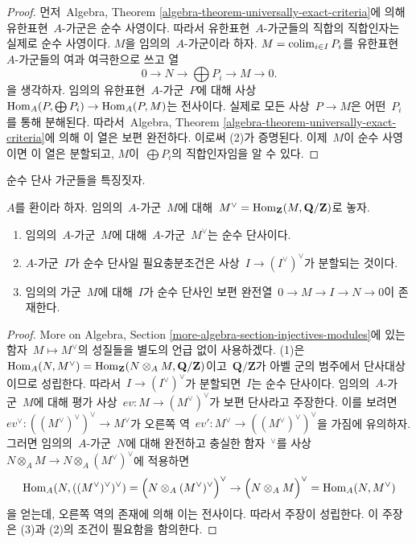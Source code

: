 \begin{proof}
먼저\  Algebra, Theorem
\ref{algebra-theorem-universally-exact-criteria}에 의해 유한표현\ 
$A$-가군은 순수 사영이다. 따라서 유한표현\  $A$-가군들의 직합의
직합인자는 실제로 순수 사영이다. $M$을 임의의\  $A$-가군이라 하자.
$M = \mathop{\mathrm{colim}}\nolimits_{i \in I} P_i$를 유한표현\  $A$-가군들의 여과 여극한으로
쓰고 열
$$
0 \to N \to \bigoplus P_i \to M \to 0.
$$
을 생각하자. 임의의 유한표현\  $A$-가군\  $P$에 대해 사상\ 
$\mathop{\mathrm{Hom}}\nolimits_A(P, \bigoplus P_i) \to \mathop{\mathrm{Hom}}\nolimits_A(P, M)$는 전사이다. 실제로
모든 사상\  $P \to M$은 어떤\  $P_i$를 통해 분해된다. 따라서\  Algebra,
Theorem \ref{algebra-theorem-universally-exact-criteria}에 의해 이 열은
보편 완전하다. 이로써 (2)가 증명된다. 이제\  $M$이 순수 사영이면
이 열은 분할되고, $M$이\  $\bigoplus P_i$의 직합인자임을 알 수 있다.
\end{proof}

\noindent
순수 단사 가군들을 특징짓자.

\begin{lemma}
\label{lemma-pure-injective}
$A$를 환이라 하자. 임의의\  $A$-가군\  $M$에 대해\ 
$M^\vee = \mathop{\mathrm{Hom}}\nolimits_\mathbf{Z}(M, \mathbf{Q}/\mathbf{Z})$로 놓자.
\begin{enumerate}
\item 임의의\  $A$-가군\  $M$에 대해\  $A$-가군\  $M^\vee$는 순수 단사이다.
\item $A$-가군\  $I$가 순수 단사일 필요충분조건은 사상\ 
$I \to (I^\vee)^\vee$가 분할되는 것이다.
\item 임의의 가군\  $M$에 대해\  $I$가 순수 단사인 보편 완전열\ 
$0 \to M \to I \to N \to 0$이 존재한다.
\end{enumerate}
\end{lemma}

\begin{proof}
More on Algebra, Section
\ref{more-algebra-section-injectives-modules}에 있는 함자\ 
$M \mapsto M^\vee$의 성질들을 별도의 언급 없이 사용하겠다.
(1)은\ 
$\mathop{\mathrm{Hom}}\nolimits_A(N, M^\vee) =
\mathop{\mathrm{Hom}}\nolimits_\mathbf{Z}(N \otimes_A M, \mathbf{Q}/\mathbf{Z})$이고\ 
$\mathbf{Q}/\mathbf{Z}$가 아벨 군의 범주에서 단사대상이므로 성립한다.
따라서\  $I \to (I^\vee)^\vee$가 분할되면\  $I$는 순수 단사이다.
임의의\  $A$-가군\  $M$에 대해 평가 사상\ 
$ev : M \to (M^\vee)^\vee$가 보편 단사라고 주장한다. 이를 보려면\ 
$ev^\vee : ((M^\vee)^\vee)^\vee \to M^\vee$가 오른쪽 역\ 
$ev' : M^\vee \to ((M^\vee)^\vee)^\vee$을 가짐에 유의하자.
그러면 임의의\  $A$-가군\  $N$에 대해 완전하고 충실한 함자\ 
${}^\vee$를 사상\ 
$N \otimes_A M \to N \otimes_A (M^\vee)^\vee$에 적용하면
$$
\mathop{\mathrm{Hom}}\nolimits_A(N, ((M^\vee)^\vee)^\vee) =
\Big(N \otimes_A (M^\vee)^\vee\Big)^\vee
\to
\Big(N \otimes_A M\Big)^\vee =
\mathop{\mathrm{Hom}}\nolimits_A(N, M^\vee)
$$
을 얻는데, 오른쪽 역의 존재에 의해 이는 전사이다. 따라서 주장이
성립한다. 이 주장은 (3)과 (2)의 조건이 필요함을 함의한다.
\end{proof}

